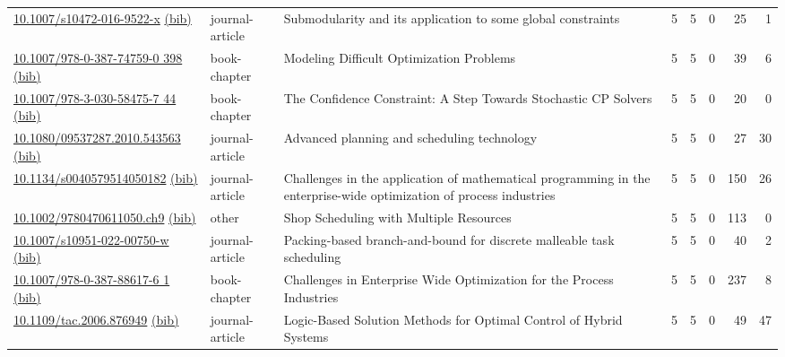 {\begin{longtable}{p{5cm}lp{11cm}rrrrr}
\href{http://dx.doi.org/10.1007/s10472-016-9522-x}{10.1007/s10472-016-9522-x} \href{https://www.doi2bib.org/bib/10.1007/s10472-016-9522-x}{(bib)} & journal-article & Submodularity and its application to some global constraints & 5 & 5 & 0 & 25 & 1 \\
\href{http://dx.doi.org/10.1007/978-0-387-74759-0_398}{10.1007/978-0-387-74759-0 398} \href{https://www.doi2bib.org/bib/10.1007/978-0-387-74759-0_398}{(bib)} & book-chapter & Modeling Difficult Optimization Problems & 5 & 5 & 0 & 39 & 6 \\
\href{http://dx.doi.org/10.1007/978-3-030-58475-7_44}{10.1007/978-3-030-58475-7 44} \href{https://www.doi2bib.org/bib/10.1007/978-3-030-58475-7_44}{(bib)} & book-chapter & The Confidence Constraint: A Step Towards Stochastic CP Solvers & 5 & 5 & 0 & 20 & 0 \\
\href{http://dx.doi.org/10.1080/09537287.2010.543563}{10.1080/09537287.2010.543563} \href{https://www.doi2bib.org/bib/10.1080/09537287.2010.543563}{(bib)} & journal-article & Advanced planning and scheduling technology & 5 & 5 & 0 & 27 & 30 \\
\href{http://dx.doi.org/10.1134/s0040579514050182}{10.1134/s0040579514050182} \href{https://www.doi2bib.org/bib/10.1134/s0040579514050182}{(bib)} & journal-article & Challenges in the application of mathematical programming in the enterprise-wide optimization of process industries & 5 & 5 & 0 & 150 & 26 \\
\href{http://dx.doi.org/10.1002/9780470611050.ch9}{10.1002/9780470611050.ch9} \href{https://www.doi2bib.org/bib/10.1002/9780470611050.ch9}{(bib)} & other & Shop Scheduling with Multiple Resources & 5 & 5 & 0 & 113 & 0 \\
\href{http://dx.doi.org/10.1007/s10951-022-00750-w}{10.1007/s10951-022-00750-w} \href{https://www.doi2bib.org/bib/10.1007/s10951-022-00750-w}{(bib)} & journal-article & Packing-based branch-and-bound for discrete malleable task scheduling & 5 & 5 & 0 & 40 & 2 \\
\href{http://dx.doi.org/10.1007/978-0-387-88617-6_1}{10.1007/978-0-387-88617-6 1} \href{https://www.doi2bib.org/bib/10.1007/978-0-387-88617-6_1}{(bib)} & book-chapter & Challenges in Enterprise Wide Optimization for the Process Industries & 5 & 5 & 0 & 237 & 8 \\
\href{http://dx.doi.org/10.1109/tac.2006.876949}{10.1109/tac.2006.876949} \href{https://www.doi2bib.org/bib/10.1109/tac.2006.876949}{(bib)} & journal-article & Logic-Based Solution Methods for Optimal Control of Hybrid Systems & 5 & 5 & 0 & 49 & 47 \\

\end{longtable}}

